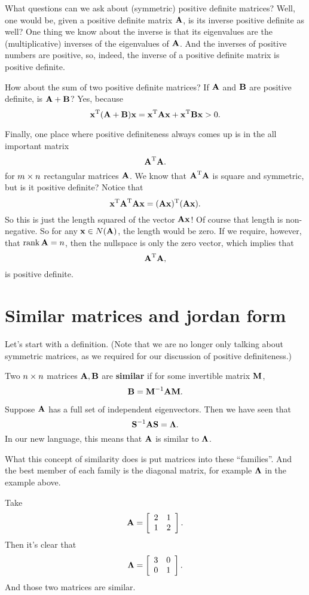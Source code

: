 
What questions can we ask about (symmetric) positive definite matrices? Well, one would be, given a positive definite matrix $\mA$, is its inverse positive definite as well? One thing we know about the inverse is that its eigenvalues are the (multiplicative) inverses of the eigenvalues of $\mA$. And the inverses of positive numbers are positive, so, indeed, the inverse of a positive definite matrix is positive definite.

How about the sum of two positive definite matrices? If $\mA$ and $\mB$ are positive definite, is $\mA + \mB$? Yes, because 
\[ \T\vx (\mA + \mB) \vx = \T\vx\mA\vx + \T\vx\mB\vx > 0. \]

Finally, one place where positive definiteness always comes up is in the all important matrix
\[ \T\mA \mA. \]
for $m \by n$ rectangular matrices $\mA$. We know that $\T\mA\mA$ is square and symmetric, but is it positive definite? Notice that
\[ \T\vx \T\mA \mA \vx = \T{(\mA \vx)}(\mA\vx). \]
So this is just the length squared of the vector $\mA\vx$! Of course that length is non-negative. So for any $\vx \in N(\mA)$, the length would be zero. If we require, however, that $\Rank \mA =n$, then the nullspace is only the zero vector, which implies that
\[ \T\mA\mA, \]
is positive definite.

\section{Similar matrices and jordan form}

Let's start with a definition. (Note that we are no longer only talking about symmetric matrices, as we required for our discussion of positive definiteness.)

\bdf
Two $n \by n$ matrices $\mA, \mB$ are \textbf{similar} if for some invertible matrix $\mM$,
\[ \mB = \mM^{-1} \mA \mM. \]
\edf

\bex
Suppose $\mA$ has a full set of independent eigenvectors. Then we have seen that
\[ \mS^{-1} \mA \mS = \mLa. \]
In our new language, this means that $\mA$ is similar to $\mLa$.
\eex

What this concept of similarity does is put matrices into these ``families''. And the best member of each family is the diagonal matrix, for example $\mLa$ in the example above. 

\bex
Take 
\[ \mA = \mat{2&1\\1&2}. \]
Then it's clear that
\[ \mLa = \mat{3&0\\0&1}. \]
And those two matrices are similar.

